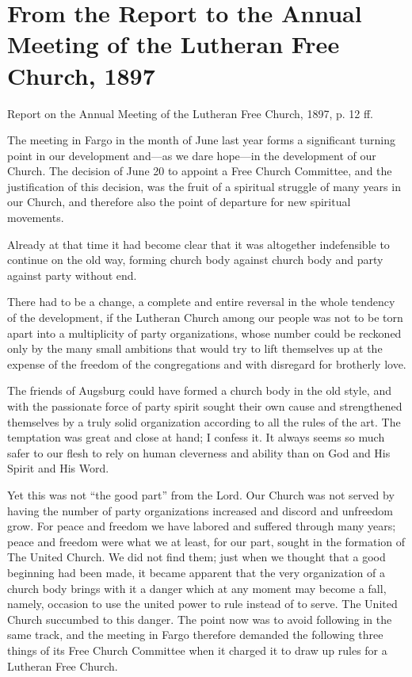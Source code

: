 
\section{From the Report to the Annual Meeting of the Lutheran Free Church, 1897}

Report on the Annual Meeting of the Lutheran Free Church, 1897, p. 12 ff.

The meeting in Fargo in the month of June last year forms a significant turning point in our development and—as we dare hope—in the development of our Church. The decision of June 20 to appoint a Free Church Committee, and the justification of this decision, was the fruit of a spiritual struggle of many years in our Church, and therefore also the point of departure for new spiritual movements.

Already at that time it had become clear that it was altogether indefensible to continue on the old way, forming church body against church body and party against party without end.

There had to be a change, a complete and entire reversal in the whole tendency of the development, if the Lutheran Church among our people was not to be torn apart into a multiplicity of party organizations, whose number could be reckoned only by the many small ambitions that would try to lift themselves up at the expense of the freedom of the congregations and with disregard for brotherly love.

The friends of Augsburg could have formed a church body in the old style, and with the passionate force of party spirit sought their own cause and strengthened themselves by a truly solid organization according to all the rules of the art. The temptation was great and close at hand; I confess it. It always seems so much safer to our flesh to rely on human cleverness and ability than on God and His Spirit and His Word.

Yet this was not “the good part” from the Lord. Our Church was not served by having the number of party organizations increased and discord and unfreedom grow. For peace and freedom we have labored and suffered through many years; peace and freedom were what we at least, for our part, sought in the formation of The United Church. We did not find them; just when we thought that a good beginning had been made, it became apparent that the very organization of a church body brings with it a danger which at any moment may become a fall, namely, occasion to use the united power to rule instead of to serve. The United Church succumbed to this danger. The point now was to avoid following in the same track, and the meeting in Fargo therefore demanded the following three things of its Free Church Committee when it charged it to draw up rules for a Lutheran Free Church.

